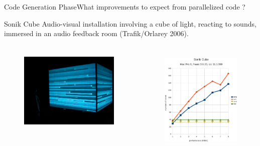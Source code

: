 \begin{frame}[fragile]{Code Generation Phase}{What improvements to expect from parallelized code ?}
\begin{block}{Sonik Cube}
Audio-visual installation involving a cube of light, reacting to sounds, immersed in an audio feedback room (Trafik/Orlarey 2006). 
\end{block}

\begin{columns}

 \begin{column}{0.55\textwidth}
	\begin{figure}
	\centering
	\includegraphics[height=4cm]{images/sonik6.jpg}
	\end{figure}
 \end{column}

 \begin{column}{0.4\textwidth}
	\begin{figure}
	\centering
	\includegraphics[height=5cm]{images/ethersonik-bench}
	\end{figure}
 \end{column}

\end{columns}

\end{frame}
